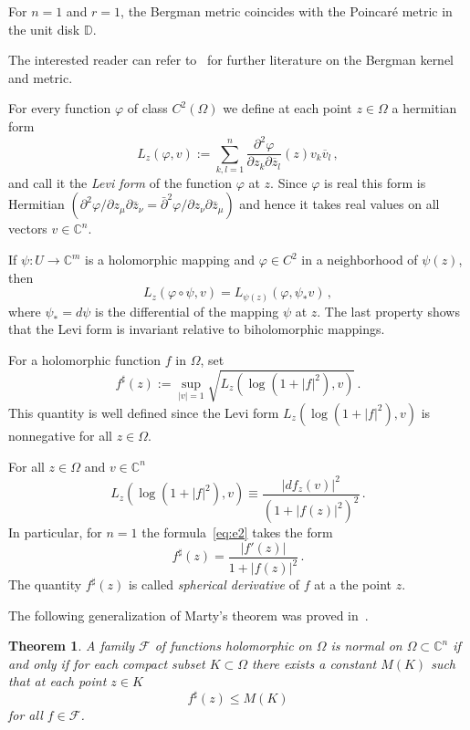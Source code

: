 \documentclass[pdflatex]{sn-jnl}%
\newtheorem{thm}{Theorem}[section]
\theoremstyle{definition}
\theoremstyle{remark}
\numberwithin{equation}{section}
\newcommand{\C}{\mathbb{C}}
\newcommand{\Cn}{\mathbb{C}^n}
\newcommand{\D}{\mathbb{D}}
\begin{document}
    For $n=1$ and $r=1$, the Bergman metric coincides with the Poincar\'e metric in the unit disk $\D$.

    The interested reader can refer to~\cite{MR3114665} for further literature on the Bergman kernel and metric.

    For every function $\varphi$ of class $C^2(\Omega)$ we define at each point $z\in \Omega$ a hermitian form
    \[
        L_z(\varphi, v):=\sum_{k,l=1}^n \frac{\partial^2\varphi}{\partial z_k \partial \overline{z}_l}(z) v_k \overline{v}_l\,,
    \]
    and call it the \emph{Levi form} of the function $\varphi$ at $z$.
    Since $\varphi$ is real this form is Hermitian $\left(\partial^2 \varphi / \partial z_\mu \partial \bar{z}_\nu=\bar{\partial}^2 \varphi / \partial z_\nu \partial \bar{z}_\mu\right)$ and hence it takes real values on all vectors $v \in \Cn$.

    If $\psi:U\rightarrow\C^m$ is a holomorphic mapping and $\varphi\in C^2$ in a neighborhood of $\psi(z)$, then
    \[
        L_z(\varphi\circ\psi,v) = L_{\psi(z)}(\varphi,\psi_{*}v)\,,
    \]
    where $\psi_{*}=d \psi$ is the differential of the mapping $\psi$ at $z$.
    The last property shows that the Levi form is invariant relative to biholomorphic mappings.

    For a holomorphic function $f$ in $\Omega$, set
    \begin{equation}
        f^\sharp (z):=\sup_{ |v|=1}\sqrt{L_z(\log(1+|f|^2), v)}\,.
        \label{eq:e2}
    \end{equation}
    This quantity is well defined since the Levi form $L_z(\log(1+|f|^2), v)$ is nonnegative for all $z\in \Omega$.

    For all $z\in \Omega$ and $v\in \mathbb{C}^n$
    \[
        L_z\left(\log \left(1+|f|^2\right), v\right)\equiv \frac{|d f_z(v)|^2}{\left(1+|f(z)|^2\right)^2}\,.
    \]
    In particular, for $n = 1$ the formula~\eqref{eq:e2} takes the form
    \begin{equation}
        f^\sharp (z)=\frac{|f'(z)|}{1+|f(z)|^2}\,.
        \label{eq:e}
    \end{equation}
    The quantity $f^\sharp (z)$ is called \emph{spherical derivative } of $f$ at a the point $z$.

    The following generalization of Marty's theorem was proved in~\cite[Theorem 2.1]{MR4071476}.

    \begin{thm}
        \label{thm:marty:1}
        A family $\mathcal{F}$ of functions holomorphic on $\Omega$ is normal on $\Omega\subset \Cn$ if and only if for each compact subset $K\subset \Omega$ there exists a constant $M(K)$ such that at each point $z\in K$
        \begin{equation}
            f^\sharp(z)\leq M(K)
            \label{eq:marty:1}
        \end{equation}
        for all $f\in \mathcal{F}$.
    \end{thm}
\end{document}
